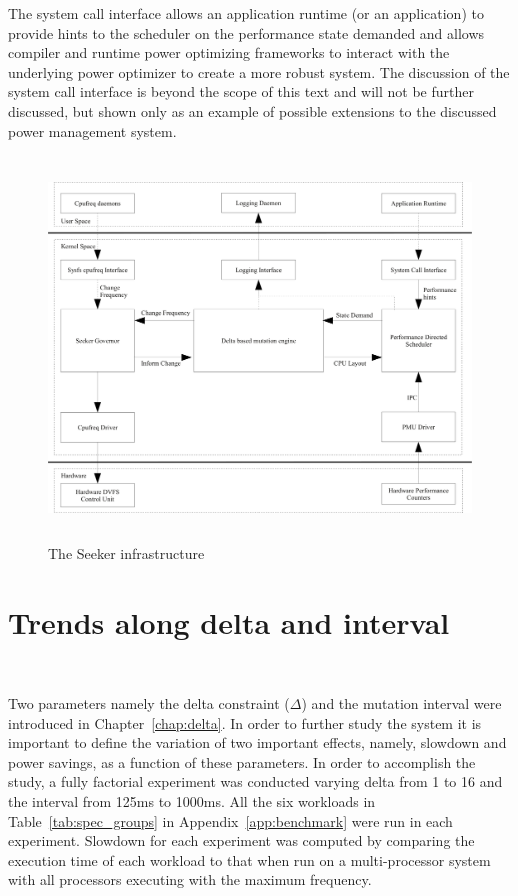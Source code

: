 The system call interface allows an application runtime (or an application) to provide hints to the scheduler
on the performance state demanded and allows compiler and runtime power optimizing frameworks to interact with the underlying
power optimizer to create a more robust system. The discussion of the system call interface is beyond the scope 
of this text and will not be further discussed, but shown only as an example of possible extensions to the 
discussed power management system.

\begin{figure}[h!]
  \begin{center}
    \includegraphics[height=4in]{figures/seeker.jpg}%
    \caption{The Seeker infrastructure}
    \label{fig:entire_seeker}
  \end{center}
\end{figure}

\section{Trends along delta and interval}~\label{sec:trends}

Two parameters namely the delta constraint ($\Delta$) and the mutation interval 
were introduced in Chapter~\ref{chap:delta}. In order to further study the system
it is important to define the variation of two important effects,
namely, slowdown and power savings, as a function of these parameters. In order
to accomplish the study, a fully factorial experiment was conducted varying delta 
from 1 to 16 and the interval from 125ms to 1000ms. All the six workloads in 
Table~\ref{tab:spec_groups} in Appendix~\ref{app:benchmark} were run in each 
experiment. Slowdown for each experiment was computed by comparing the execution time of each workload 
to that when run on a multi-processor system with all processors executing with the maximum frequency.


